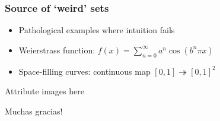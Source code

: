\documentclass[12pt]{beamer}
\begin{document}
\begin{frame}
\frametitle{Source of `weird' sets}
\begin{itemize}[<+->]
	\item Pathological examples where intuition fails
	\item \alert{Weierstrass function:} $f(x) = \sum_{n=0}^\infty a^n \cos(b^n\pi x)$
	\item \alert{Space-filling curves:} continuous map $[0, 1] \twoheadrightarrow [0,1]^2$	
\end{itemize}

%
\end{frame}

\begin{frame}
 	Attribute images here
\end{frame}

\begin{frame}[standout]
	\Huge Muchas gracias!
\end{frame}
\end{document}
